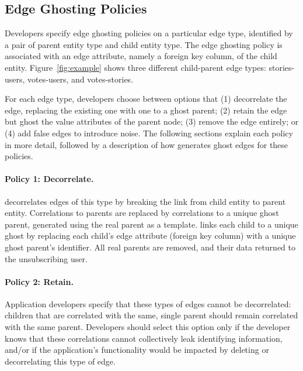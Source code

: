 
\subsection{Edge Ghosting Policies}
Developers specify edge ghosting policies on a particular edge type, identified by a pair of parent
entity type and child entity type. The edge ghosting policy is associated with an edge attribute,
namely a foreign key column, of the child entity. Figure~\ref{fig:example} shows three different
child-parent edge types: stories-users, votes-users, and votes-stories.

For each edge type, developers choose between options that (1) decorrelate the edge, replacing
the existing one with one to a ghost parent; (2) retain the edge but ghost the value attributes of the
parent node; (3) remove the edge entirely; or (4) add false edges to introduce noise.
The following sections explain each policy in more detail, followed by a description of how \sys
generates ghost edges for these policies.



\paragraph{Policy 1: Decorrelate.}
\sys decorrelates edges of this type by breaking the link from child entity to parent entity.
Correlations to parents are replaced by correlations to a unique ghost parent, generated using the
real parent as a template.  \sys links each child to a unique ghost by replacing each child's edge
attribute (foreign key column) with a unique ghost parent's identifier. 
All real parents are removed, and their data returned to the unsubscribing user.

\paragraph{Policy 2: Retain.}
Application developers specify that these types of edges cannot be decorrelated: children 
that are correlated with the same, single parent should remain correlated with the same 
parent. Developers should select this option only if the developer knows that these correlations
cannot collectively leak identifying information, and/or if the application's functionality would be
impacted by deleting or decorrelating this type of edge.

